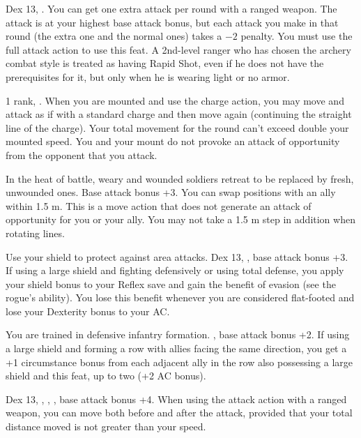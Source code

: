 {}
{Dex 13, .}
{You can get one extra attack per round with a ranged weapon. The attack is at your highest base attack bonus, but each attack you make in that round (the extra one and the normal ones) takes a $-2$ penalty. You must use the full attack action to use this feat.}{}
{A 2nd-level ranger who has chosen the archery combat style is treated as having Rapid Shot, even if he does not have the prerequisites for it, but only when he is wearing light or no armor.}

{ 1 rank, .}
{When you are mounted and use the charge action, you may move and attack as if with a standard charge and then move again (continuing the straight line of the charge). Your total movement for the round can't exceed double your mounted speed. You and your mount do not provoke an attack of opportunity from the opponent that you attack.}

{In the heat of battle, weary and wounded soldiers retreat to be replaced by fresh, unwounded ones.}
{Base attack bonus +3.}
{You can swap positions with an ally within 1.5 m. This is a move action that does not generate an attack of opportunity for you or your ally. You may not take a 1.5 m step in addition when rotating lines.}{}{}

{Use your shield to protect against area attacks.}
{Dex 13, , base attack bonus +3.}
{If using a large shield and fighting defensively or using total defense, you apply your shield bonus to your Reflex save and gain the benefit of evasion (see the rogue's ability). You lose this benefit whenever you are considered flat-footed and lose your Dexterity bonus to your AC.}{}{}

{You are trained in defensive infantry formation.}
{, base attack bonus +2.}
{If using a large shield and forming a row with allies facing the same direction, you get a +1 circumstance bonus from each adjacent ally in the row also possessing a large shield and this feat, up to two (+2 AC bonus).}{}{}

{Dex 13, , , , base attack bonus +4.}
{When using the attack action with a ranged weapon, you can move both before and after the attack, provided that your total distance moved is not greater than your speed.}

